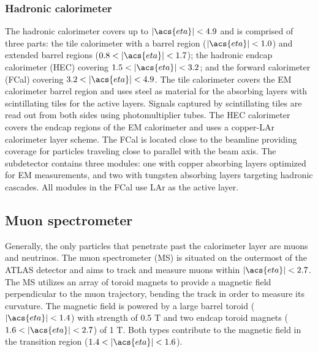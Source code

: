 \documentclass[../thesis.tex]{subfiles}
\begin{document}
\subsubsection*{Hadronic calorimeter}
The hadronic calorimeter \citep{atlas} covers up to $|\acs{eta}|<4.9$ and is comprised of three parts: the tile calorimeter with a barrel region ($|\acs{eta}|<1.0$) and extended barrel regions ($0.8<|\acs{eta}|<1.7$); the hadronic endcap calorimeter (\acs{HEC}) covering $1.5<|\acs{eta}|<3.2$; and the forward calorimeter (\acs{FCal}) covering $3.2<|\acs{eta}|<4.9$. The tile calorimeter covers the \acs{EM} calorimeter barrel region and uses steel as material for the absorbing layers with scintillating tiles for the active layers. Signals captured by scintillating tiles are read out from both sides using photomultiplier tubes. The \acs{HEC} calorimeter covers the endcap regions of the \acs{EM} calorimeter and uses a copper-\acs{LAr} calorimeter layer scheme. The \acs{FCal} is located close to the beamline providing coverage for particles traveling close to parallel with the beam axis. The subdetector contains three modules: one with copper absorbing layers optimized for \acs{EM} measurements, and two with tungsten absorbing layers targeting hadronic cascades. All modules in the \acs{FCal} use \acs{LAr} as the active layer.

\subsection{Muon spectrometer}
Generally, the only particles that penetrate past the calorimeter layer are muons and neutrinos. The muon spectrometer (\acs{MS}) \citep{atlas} is situated on the outermost of the ATLAS detector and aims to track and measure muons within $|\acs{eta}|<2.7$. The \acs{MS} utilizes an array of toroid magnets to provide a magnetic field perpendicular to the muon trajectory, bending the track in order to measure its curvature. The magnetic field is powered by a large barrel toroid ($|\acs{eta}|<1.4$) with strength of 0.5 T and two endcap toroid magnets ($1.6<|\acs{eta}|<2.7$) of 1 T. Both types contribute to the magnetic field in the transition region ($1.4<|\acs{eta}|<1.6$).
\end{document}
